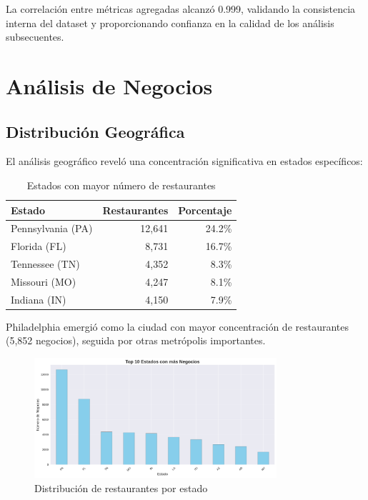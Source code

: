 \documentclass[12pt,a4paper,twoside,openany]{book}
\begin{document}
La correlación entre métricas agregadas alcanzó 0.999, validando la consistencia interna del dataset y proporcionando confianza en la calidad de los análisis subsecuentes.

\section{Análisis de Negocios}

\subsection{Distribución Geográfica}

El análisis geográfico reveló una concentración significativa en estados específicos:

\begin{table}[H]
\centering
\caption{Estados con mayor número de restaurantes}
\begin{tabular}{@{}lrr@{}}
\toprule
\textbf{Estado} & \textbf{Restaurantes} & \textbf{Porcentaje} \\
\midrule
Pennsylvania (PA) & 12,641 & 24.2\% \\
Florida (FL) & 8,731 & 16.7\% \\
Tennessee (TN) & 4,352 & 8.3\% \\
Missouri (MO) & 4,247 & 8.1\% \\
Indiana (IN) & 4,150 & 7.9\% \\
\bottomrule
\end{tabular}
\end{table}

Philadelphia emergió como la ciudad con mayor concentración de restaurantes (5,852 negocios), seguida por otras metrópolis importantes.

\begin{figure}[H]
\centering
\includegraphics[width=0.8\textwidth]{figures/business_states_distribution.png}
\caption{Distribución de restaurantes por estado}
\label{fig:business_states_distribution}
\end{figure}
\end{document}

